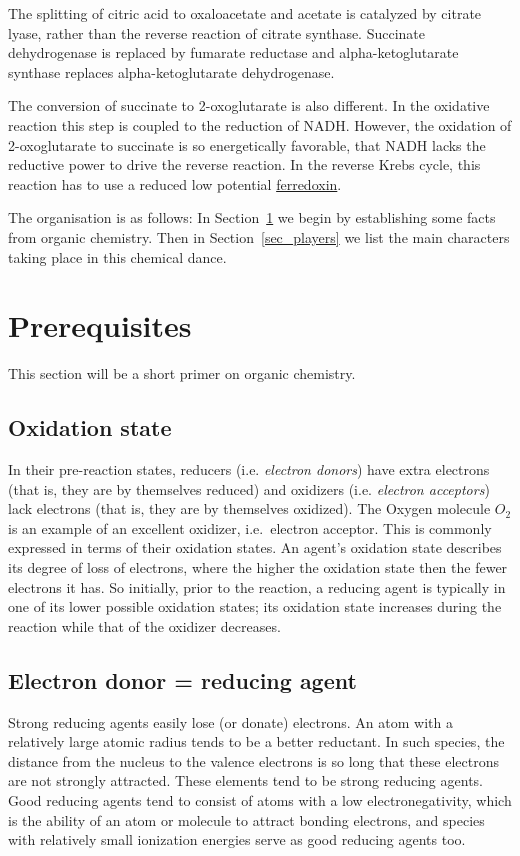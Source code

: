 \documentclass{article}
\begin{document}
The splitting of citric acid to oxaloacetate and acetate is catalyzed by citrate lyase,
rather than the reverse reaction of citrate synthase. Succinate dehydrogenase is
replaced by fumarate reductase and alpha-ketoglutarate synthase replaces alpha-ketoglutarate
dehydrogenase.

The conversion of succinate to 2-oxoglutarate is also different. In the oxidative reaction
this step is coupled to the reduction of NADH\@. However, the oxidation of 2-oxoglutarate to
succinate is so energetically favorable, that NADH lacks the reductive power to drive the
reverse reaction. In the reverse Krebs cycle, this reaction has to use a reduced low potential
\href{https://en.wikipedia.org/wiki/Ferredoxin}{ferredoxin}.

The organisation is as follows: In Section~\ref{sec_prerequisites} we begin by
establishing some facts from organic chemistry. Then in Section~\ref{sec_players}
we list the main characters taking place in this chemical dance.


\pagebreak
\section{Prerequisites}\label{sec_prerequisites}

This section will be a short primer on organic chemistry.

\subsection{Oxidation state}
In their pre-reaction states, reducers (i.e. {\em electron donors\/}) have extra electrons
(that is, they are by themselves reduced) and oxidizers (i.e. {\em electron acceptors\/})
lack electrons (that is, they are by themselves oxidized). The Oxygen molecule $O_2$ is an
example of an excellent oxidizer, i.e.\ electron acceptor. This is commonly expressed in
terms of their oxidation states. An agent's oxidation state describes its degree of loss
of electrons, where the higher the oxidation state then the fewer electrons it has.
So initially, prior to the reaction, a reducing agent is typically in one of its lower
possible oxidation states; its oxidation state increases during the reaction while that of
the oxidizer decreases.

\subsection{Electron donor = reducing agent}
Strong reducing agents easily lose (or donate) electrons. An atom with a relatively large
atomic radius tends to be a better reductant. In such species, the distance from the
nucleus to the valence electrons is so long that these electrons are not strongly
attracted. These elements tend to be strong reducing agents. Good reducing agents tend to
consist of atoms with a low electronegativity, which is the ability of an atom or molecule
to attract bonding electrons, and species with relatively small ionization energies serve
as good reducing agents too.
\end{document}
